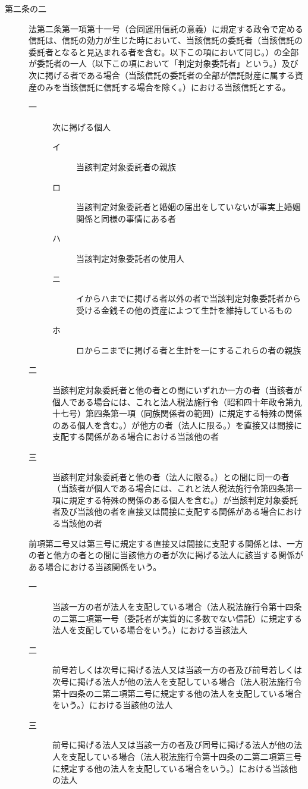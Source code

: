 \documentclass[twocolumn,a4j,10pt]{ltjtarticle}
\begin{document}
\begin{description}
\item[第二条の二]法第二条第一項第十一号（合同運用信託の意義）に規定する政令で定める信託は、信託の効力が生じた時において、当該信託の委託者（当該信託の委託者となると見込まれる者を含む。以下この項において同じ。）の全部が委託者の一人（以下この項において「判定対象委託者」という。）及び次に掲げる者である場合（当該信託の委託者の全部が信託財産に属する資産のみを当該信託に信託する場合を除く。）における当該信託とする。
\begin{description}
\item[一]次に掲げる個人
\begin{description}
\item[イ]当該判定対象委託者の親族
\item[ロ]当該判定対象委託者と婚姻の届出をしていないが事実上婚姻関係と同様の事情にある者
\item[ハ]当該判定対象委託者の使用人
\item[ニ]イからハまでに掲げる者以外の者で当該判定対象委託者から受ける金銭その他の資産によつて生計を維持しているもの
\item[ホ]ロからニまでに掲げる者と生計を一にするこれらの者の親族
\end{description}
\item[二]当該判定対象委託者と他の者との間にいずれか一方の者（当該者が個人である場合には、これと法人税法施行令（昭和四十年政令第九十七号）第四条第一項（同族関係者の範囲）に規定する特殊の関係のある個人を含む。）が他方の者（法人に限る。）を直接又は間接に支配する関係がある場合における当該他の者
\item[三]当該判定対象委託者と他の者（法人に限る。）との間に同一の者（当該者が個人である場合には、これと法人税法施行令第四条第一項に規定する特殊の関係のある個人を含む。）が当該判定対象委託者及び当該他の者を直接又は間接に支配する関係がある場合における当該他の者
\end{description}
\item[]前項第二号又は第三号に規定する直接又は間接に支配する関係とは、一方の者と他方の者との間に当該他方の者が次に掲げる法人に該当する関係がある場合における当該関係をいう。
\begin{description}
\item[一]当該一方の者が法人を支配している場合（法人税法施行令第十四条の二第二項第一号（委託者が実質的に多数でない信託）に規定する法人を支配している場合をいう。）における当該法人
\item[二]前号若しくは次号に掲げる法人又は当該一方の者及び前号若しくは次号に掲げる法人が他の法人を支配している場合（法人税法施行令第十四条の二第二項第二号に規定する他の法人を支配している場合をいう。）における当該他の法人
\item[三]前号に掲げる法人又は当該一方の者及び同号に掲げる法人が他の法人を支配している場合（法人税法施行令第十四条の二第二項第三号に規定する他の法人を支配している場合をいう。）における当該他の法人
\end{description}
\end{description}
\end{document}
